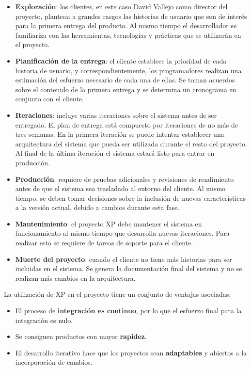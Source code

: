 \begin{itemize}
\item \textbf{Exploración}: los clientes, en este caso David Vallejo como director del proyecto, plantean a grandes rasgos las historias de usuario que son de interés para la primera entrega del producto. Al mismo tiempo el desarrollador se familiariza con las herramientas, tecnologías y prácticas que se utilizarán en el proyecto.
\item \textbf{Planificación de la entrega}: el cliente establece la prioridad de cada historia de usuario, y correspondientemente, los programadores realizan una estimación del esfuerzo necesario de cada una de ellas. Se toman acuerdos sobre el contenido de la primera entrega y se determina un cronograma en conjunto con el cliente.
\item \textbf{Iteraciones}: incluye varias iteraciones sobre el sistema antes de ser entregado. El plan de entrega está compuesto por iteraciones de no más de tres semanas. En la primera iteración se puede intentar establecer una arquitectura del sistema que pueda ser utilizada durante el resto del proyecto. Al final de la última iteración el sistema estará listo para entrar en producción.
\item \textbf{Producción}: requiere de pruebas adicionales y revisiones de rendimiento antes de que el sistema sea trasladado al entorno del cliente. Al mismo tiempo, se deben tomar decisiones sobre la inclusión de nuevas características a la versión actual, debido a cambios durante esta fase.
\item \textbf{Mantenimiento}: el proyecto XP debe mantener el sistema en funcionamiento al mismo tiempo que desarrolla nuevas iteraciones. Para realizar esto se requiere de tareas de soporte para el cliente.
\item \textbf{Muerte del proyecto}: cuando el cliente no tiene más historias para ser incluidas en el sistema. Se genera la documentación final del sistema y no se realizan más cambios en la arquitectura.
\end{itemize}

La utilización de \acs{XP} en el proyecto tiene un conjunto de ventajas asociadas:
\begin{itemize}
\item El proceso de \textbf{integración es continuo}, por lo que el esfuerzo final para la integración es nulo.
\item Se consiguen productos con mayor \textbf{rapidez}.
\item El desarrollo iterativo hace que los proyectos sean \textbf{adaptables} y abiertos a la incorporación de cambios.
\end{itemize}

